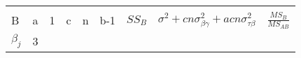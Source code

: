 \documentclass[12pt,]{article}
\begin{document}
\begin{longtable}[]{@{}lllllllll@{}}
\begin{minipage}[t]{0.12\columnwidth}
\strut
\end{minipage} & \begin{minipage}[t]{0.15\columnwidth}\raggedright
\strut
\end{minipage} & \begin{minipage}[t]{0.21\columnwidth}\raggedright
\strut
\end{minipage} & \begin{minipage}[t]{0.09\columnwidth}\raggedright
\strut
\end{minipage}\tabularnewline
\begin{minipage}[t]{0.06\columnwidth}\raggedright
B\strut
\end{minipage} & \begin{minipage}[t]{0.03\columnwidth}\raggedright
a\strut
\end{minipage} & \begin{minipage}[t]{0.03\columnwidth}\raggedright
1\strut
\end{minipage} & \begin{minipage}[t]{0.03\columnwidth}\raggedright
c\strut
\end{minipage} & \begin{minipage}[t]{0.03\columnwidth}\raggedright
n\strut
\end{minipage} & \begin{minipage}[t]{0.12\columnwidth}\raggedright
b-1\strut
\end{minipage} & \begin{minipage}[t]{0.15\columnwidth}\raggedright
\(SS_B\)\strut
\end{minipage} & \begin{minipage}[t]{0.21\columnwidth}\raggedright
\(\sigma^2+cn\sigma^2_{\beta\gamma}+acn\sigma^2_{\tau\beta}\)\strut
\end{minipage} & \begin{minipage}[t]{0.09\columnwidth}\raggedright
\(\frac{MS_{B}}{MS_{AB}}\)\strut
\end{minipage}\tabularnewline
\begin{minipage}[t]{0.06\columnwidth}\raggedright
\(\beta_{j}\)\strut
\end{minipage} & \begin{minipage}[t]{0.03\columnwidth}\raggedright
3\strut
\end{minipage} & \begin{minipage}[t]{0.03\columnwidth}\raggedright
\strut
\end{minipage} & \begin{minipage}[t]{0.03\columnwidth}\raggedright

\end{minipage}
\end{longtable}
\end{document}
